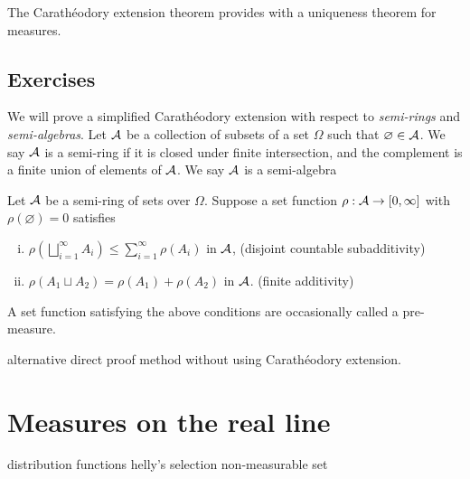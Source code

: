 \documentclass{../note}
\begin{document}
\begin{prb}
The Carath\'eodory extension theorem provides with a uniqueness theorem for measures.
\end{prb}
\begin{pf}
\end{pf}


\section*{Exercises}

\begin{prb}
We will prove a simplified Carath\'eodory extension with respect to \emph{semi-rings} and \emph{semi-algebras}.
Let $\mathcal{A}$ be a collection of subsets of a set $\Omega$ such that $\varnothing\in\mathcal{A}$.
We say $\mathcal{A}$ is a semi-ring if it is closed under finite intersection, and the complement is a finite union of elements of $\mathcal{A}$.
We say $\mathcal{A}$ is a semi-algebra

Let $\mathcal{A}$ be a semi-ring of sets over $\Omega$.
Suppose a set function $\rho:\mathcal{A}\to[0,\infty]$ with $\rho(\varnothing)=0$ satisfies
\begin{enumerate}[(i)]
\item $\rho(\bigsqcup_{i=1}^\infty A_i)\le\sum_{i=1}^\infty\rho(A_i)$ in $\mathcal{A}$,
\hfill(disjoint countable subadditivity)
\item $\rho(A_1\sqcup A_2)=\rho(A_1)+\rho(A_2)$ in $\mathcal{A}$.
\hfill(finite additivity)
\end{enumerate}
A set function satisfying the above conditions are occasionally called a pre-measure.
\begin{parts}
\item
\item 
\end{parts}
\end{prb}

\begin{prb}
alternative direct proof method without using Carath\'eodory extension.
\end{prb}





\chapter{Measures on the real line}

distribution functions
helly's selection
non-measurable set
\end{document}
